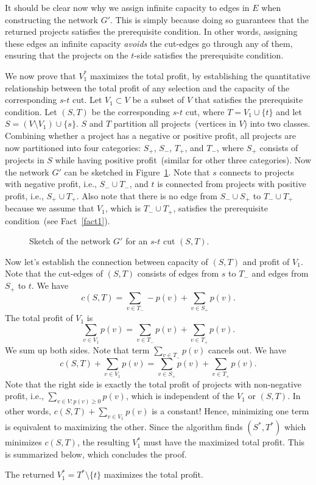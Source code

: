 It should be clear now why we assign infinite capacity to edges in $E$ when constructing the network $G'$.
This is simply because doing so guarantees that the returned projects satisfies the prerequisite condition.
In other words, assigning these edges an infinite capacity \emph{avoids} the cut-edges go through any of them,
ensuring that the projects on the $t$-side satisfies the prerequisite condition.


We now prove that $V_1^*$ maximizes the total profit, by establishing the quantitative relationship between the
total profit of any selection and the capacity of the corresponding $s$-$t$ cut.
Let $V_1 \subset V$ be a subset of $V$ that satisfies the prerequisite condition. 
Let $(S,T)$ be the corresponding $s$-$t$ cut, where $T = V_1\cup \{t\}$ and
let $S = (V\setminus V_1)\cup \{s\}$.  %
$S$ and $T$ partition all projects~(vertices in $V$) into two classes.
Combining whether a project has a negative or positive profit, 
all projects are now partitioned into four categories: $S_+$, $S_-$, $T_+$, and $T_-$, where
$S_+$ consists of projects in $S$ while having positive profit~(similar for other three categories).
Now the network $G'$ can be sketched in Figure~\ref{fig:ps5}.
Note that $s$ connects to projects with negative profit, i.e., $S_-\cup T_-$,
and $t$ is connected from projects with positive profit, i.e., $S_+\cup T_+$.
Also note that there is no edge from $S_-\cup S_+$ to $T_-\cup T_+$ because we assume that $V_1$, which is $T_-\cup T_+$, 
satisfies the prerequisite condition~(see Fact~\ref{fact1}). 

\begin{figure}[!h]
\centering{}
\caption{Sketch of the network $G'$ for an $s$-$t$ cut $(S,T)$. }
\label{fig:ps5}
\end{figure}

Now let's establish the connection between capacity of $(S,T)$ and profit of $V_1$.
Note that the cut-edges of $(S,T)$ consists of edges from $s$ to $T_-$ and edges from $S_+$ to $t$.
We have 
$$c(S, T) = \sum_{v\in T_-} -p(v) + \sum_{v\in S_+} p(v).$$
The total profit of $V_1$ is 
$$\sum_{v\in V_1} p(v) = \sum_{v\in T_-} p(v) + \sum_{v\in T_+} p(v).$$
We sum up both sides. Note that term $\sum_{v\in T_-} p(v)$ cancels out.
We have 
$$c(S, T) + \sum_{v\in V_1} p(v) = \sum_{v\in S_+} p(v) + \sum_{v\in T_+} p(v).$$
Note that the right side is exactly the total profit of projects with non-negative profit, i.e., $\sum_{v\in V: p(v) \ge 0} p(v)$,
which is independent of the $V_1$ or $(S,T)$. In other words, 
$c(S, T) + \sum_{v\in V_1} p(v)$ is a constant! Hence, minimizing one term is equivalent to maximizing the other. 
Since the algorithm finds $(S^*, T^*)$ which minimizes $c(S,T)$, the resulting $V_1^*$ must
have the maximized total profit. This is summarized below, which concludes the proof.
\begin{fact}
The returned $V_1^* = T^*\setminus\{t\}$ maximizes the total profit.
\end{fact}

